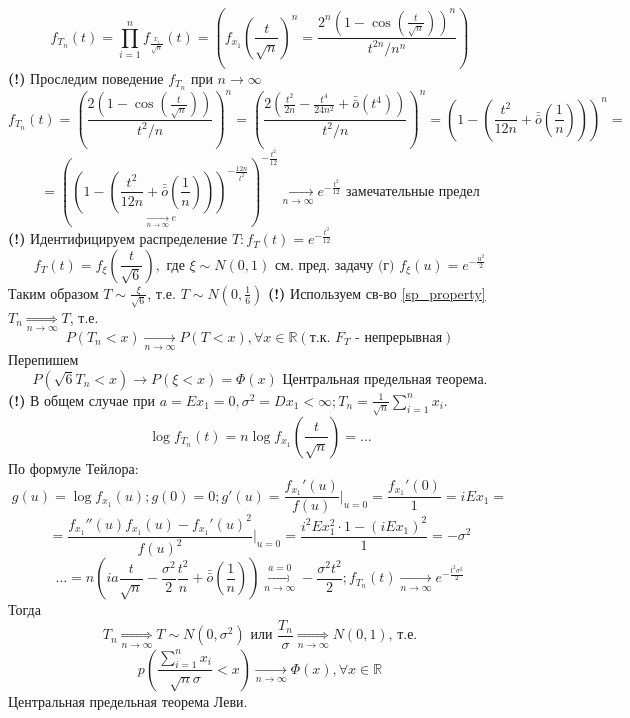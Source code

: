 \begin{exmp}
\begin{enumerate}
		\[ f_{T_n} (t) = \prod_{i=1}^{n} f_{\frac{x_i}{\sqrt{n}}} (t) = \left( f_{x_1} \left(\frac{t}{\sqrt{n}}\right)^n = \frac{2^n (1 - \cos \left( \frac{t}{\sqrt{n}} \right))^n}{t^{2n}/n^n} \right) \]
		\textbf{(!)} Проследим поведение $f_{T_n}$ при $n \to \infty$
		\[ f_{T_n} (t) = \left( \frac{2 (1 - \cos \left( \frac{t}{\sqrt{n}} \right))}{t^2 / n} \right)^n = \left( \frac{2 \left( \frac{t^2}{2n} - \frac{t^4}{24n^2} + \bar{\bar o} (t^4) \right)}{t^2 / n} \right)^n = \left( 1 - \left( \frac{t^2}{12n} + \bar{\bar o} \left( \frac{1}{n} \right) \right) \right)^n = \]
		\[ = \left( \underset{\underset{n \to \infty}{\to} e}{\left( 1 - \left( \frac{t^2}{12n} + \bar{\bar o} \left(\frac{1}{n}\right) \right) \right)^{-\frac{12n}{t^2}}} \right)^{- \frac{t^2}{12}} \underset{n \to \infty}{\to} e^{- \frac{t^2}{12}} \text{ замечательные предел} \]
		\textbf{(!)} Идентифицируем распределение $T: f_{T} (t) = e^{-\frac{t^2}{12}}$
		\[ f_{T} (t) = f_{\xi} \left( \frac{t}{\sqrt{6}} \right), \text{ где } \xi \sim N(0, 1) \text{ см. пред. задачу (г) } f_{\xi} (u) = e^{- \frac{u^2}{2}} \]
		Таким образом $T \sim \frac{\xi}{\sqrt{6}}$, т.е. $T \sim N \left( 0, \frac{1}{6} \right)$
		\textbf{(!)} Используем св-во \ref{sp_property} $T_n \underset{n \to \infty}{\Rightarrow} T$, т.е.
		\[ P(T_n < x) \underset{n \to \infty}{\to} P(T < x), \forall x \in \mathbb{R} (\text{т.к. } F_T \text{ - непрерывная}) \]
		Перепишем
		\[ P(\sqrt{6} T_n < x) \to P(\xi < x) = \Phi (x) \text{ Центральная предельная теорема.} \]
		\textbf{(!)} В общем случае при $a = Ex_1 = 0, \sigma^2 = Dx_1 < \infty; T_n = \frac{1}{\sqrt{n}} \sum\limits_{i=1}^{n} x_i$.
		\[ \log f_{T_n} (t) = n \log f_{x_1} \left( \frac{t}{\sqrt{n}} \right) = \dots \]
		По формуле Тейлора:
		\[
		g(u) = \log f_{x_1} (u); g(0) = 0; g'(u) = \frac{f_{x_1}'(u)}{f(u)} \bigg|_{u=0} = \frac{f_{x_1}' (0)}{1} = i Ex_1 =
		\]
		\[
		= \frac{f_{x_1}'' (u) f_{x_1} (u) - f_{x_1}' (u)^2}{f(u)^2} \bigg|_{u=0} = \frac{i^2 E x_1^2 \cdot 1 - (i Ex_1)^2}{1} = - \sigma^2
		\]
		\[ \dots = n \left( ia \frac{t}{\sqrt{n}} - \frac{\sigma^2}{2} \frac{t^2}{n} + \bar{\bar o} \left( \frac{1}{n} \right) \right) \overset{a=0}{\underset{n \to \infty}{\to}} - \frac{\sigma^2 t^2}{2}; f_{T_n} (t) \underset{n \to \infty}{\to} e^{- \frac{t^2 \sigma^2}{2}} \]
		Тогда
		\[ T_n \underset{n \to \infty}{\Rightarrow} T \sim N (0, \sigma^2) \text{ или } \frac{T_n}{\sigma} \underset{n \to \infty}{\Rightarrow} N(0, 1) \text{, т.е.} \]
		\[ p \left( \frac{\sum\limits_{i=1}^{n} x_i}{\sqrt{n} \sigma} < x \right) \underset{n \to \infty}{\to} \Phi (x), \forall x \in \mathbb{R} \]
		Центральная предельная теорема Леви.
	\end{enumerate}
\end{exmp}

